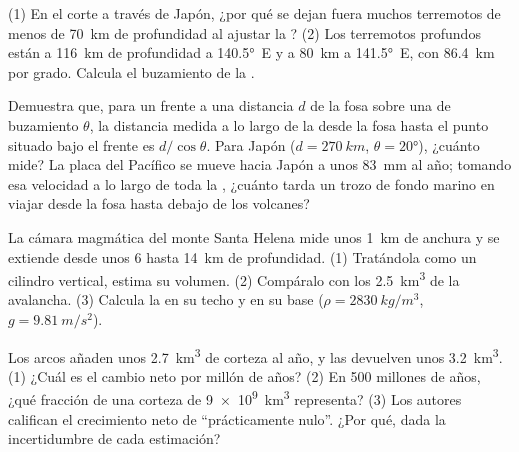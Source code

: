 \begin{exercise}[$\star\star$]\label{exo:g12:subduction-magmatism:11}
(1) En el corte a través de Japón, ¿por qué se dejan fuera muchos terremotos
de menos de \qty{70}{km} de profundidad al ajustar la ? (2) Los
terremotos profundos están a \qty{116}{km} de profundidad a \ang{140.5}~E y a
\qty{80}{km} a \ang{141.5}~E, con \qty{86.4}{km} por grado. Calcula el
buzamiento de la .
\end{exercise}

\begin{exercise}[$\star\star\star$]\label{exo:g12:subduction-magmatism:12}
Demuestra que, para un frente a una distancia $d$ de la fosa sobre una  de
buzamiento $\theta$, la distancia medida a lo largo de la  desde la fosa
hasta el punto situado bajo el frente es $d/\cos\theta$. Para Japón ($d = \qty{270}{km}$, $\theta = \ang{20}$), ¿cuánto mide? La placa del Pacífico se
mueve hacia Japón a unos \qty{83}{mm} al año; tomando esa velocidad a lo
largo de toda la , ¿cuánto tarda un trozo de fondo marino en viajar desde
la fosa hasta debajo de los volcanes?
\end{exercise}

\begin{exercise}[$\star\star\star$]\label{exo:g12:subduction-magmatism:13}
La cámara magmática del monte Santa Helena mide unos \qty{1}{km} de anchura y
se extiende desde unos 6 hasta \qty{14}{km} de profundidad. (1) Tratándola
como un cilindro vertical, estima su volumen. (2) Compáralo con los
\qty{2.5}{km^3} de la avalancha. (3) Calcula la  en su
techo y en su base ($\rho =
\qty{2830}{kg/m^3}$, $g = \qty{9.81}{m/s^2}$).
\end{exercise}

\begin{exercise}[$\star\star\star$]\label{exo:g12:subduction-magmatism:14}
Los arcos añaden unos \qty{2.7}{km^3} de corteza al año, y las  devuelven unos \qty{3.2}{km^3}. (1) ¿Cuál es el cambio neto por
millón de años? (2) En 500 millones de años, ¿qué fracción de una corteza de
\qty{9e9}{km^3} representa? (3) Los autores califican el crecimiento neto de
``prácticamente nulo''. ¿Por qué, dada la incertidumbre de cada estimación?
\end{exercise}

